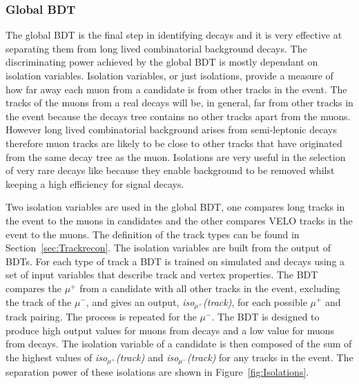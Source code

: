 \subsubsection{Global BDT}
\label{sec:globalBDT}

The global BDT is the final step in identifying \bmumu decays and it is very effective at separating them from long lived combinatorial background decays. The discriminating power achieved by the global BDT is mostly dependant on isolation variables. Isolation variables, or just isolations, provide a measure of how far away each muon from a \bmumu candidate is from other tracks in the event. The tracks of the muons from a real \bmumu decays will be, in general, far from other tracks in the event because the \bmumu decays tree contains no other tracks apart from the muons. However long lived combinatorial background arises from semi-leptonic decays therefore muon tracks are likely to be close to other tracks that have originated from the same decay tree as the muon. %
Isolations are very useful in the selection of very rare decays like \smumu because they enable background to be removed whilst keeping a high efficiency for signal decays.

Two isolation variables are used in the global BDT, one compares long tracks in the event to the muons in \bmumu candidates and the other compares VELO tracks in the event to the muons. The definition of the track types can be found in Section~\ref{sec:Trackrecon}. The isolation variables are built from the output of BDTs. For each type of track a BDT is trained on simulated \bsmumu and \bbbarmumux decays using a set of input variables that describe track and vertex properties. The BDT compares the $\mu^{+}$ from a \bsmumu candidate with all other tracks in the event, excluding the track of the $\mu^{-}$, and gives an output, {\it iso$_{\mu^{+}}$(track)}, for each possible $\mu^{+}$ and track pairing. The process is repeated for the $\mu^{-}$. The BDT is designed to produce high output values for muons from \bbbarmumux decays and a low value for muons from \bsmumu decays. The isolation variable of a \bsmumu candidate is then composed of the sum of the highest values of {\it iso$_{\mu^{+}}$(track)} and {\it iso$_{\mu^{-}}$(track)} for any tracks in the event. The separation power of these isolations are shown in Figure~\ref{fig:Isolations}. %

